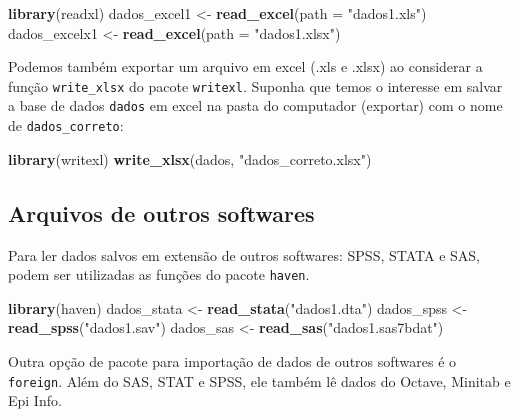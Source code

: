 \documentclass[
]{book}
\newenvironment{Shaded}{\begin{snugshade}}{\end{snugshade}}
\newcommand{\DataTypeTok}[1]{\textcolor[rgb]{0.13,0.29,0.53}{#1}}
\newcommand{\KeywordTok}[1]{\textcolor[rgb]{0.13,0.29,0.53}{\textbf{#1}}}
\newcommand{\NormalTok}[1]{#1}
\newcommand{\StringTok}[1]{\textcolor[rgb]{0.31,0.60,0.02}{#1}}
\begin{document}
\begin{Shaded}
\begin{Highlighting}[]
\KeywordTok{library}\NormalTok{(readxl)}
\NormalTok{dados_excel1 <-}\StringTok{ }\KeywordTok{read_excel}\NormalTok{(}\DataTypeTok{path =} \StringTok{"dados1.xls"}\NormalTok{)}
\NormalTok{dados_excelx1 <-}\StringTok{ }\KeywordTok{read_excel}\NormalTok{(}\DataTypeTok{path =} \StringTok{"dados1.xlsx"}\NormalTok{)}
\end{Highlighting}
\end{Shaded}

Podemos também exportar um arquivo em excel (.xls e .xlsx) ao considerar a função \texttt{write\_xlsx} do pacote \texttt{writexl}. Suponha que temos o interesse em salvar a base de dados \texttt{dados} em excel na pasta do computador (exportar) com o nome de \texttt{dados\_correto}:

\begin{Shaded}
\begin{Highlighting}[]
\KeywordTok{library}\NormalTok{(writexl)}
\KeywordTok{write_xlsx}\NormalTok{(dados, }\StringTok{"dados_correto.xlsx"}\NormalTok{)}
\end{Highlighting}
\end{Shaded}

\hypertarget{arquivos-de-outros-softwares}{%
\subsection{Arquivos de outros softwares}\label{arquivos-de-outros-softwares}}

Para ler dados salvos em extensão de outros softwares: SPSS, STATA e SAS, podem ser utilizadas as funções do pacote \texttt{haven}.

\begin{Shaded}
\begin{Highlighting}[]
\KeywordTok{library}\NormalTok{(haven)}
\NormalTok{dados_stata <-}\StringTok{ }\KeywordTok{read_stata}\NormalTok{(}\StringTok{"dados1.dta"}\NormalTok{)}
\NormalTok{dados_spss <-}\StringTok{ }\KeywordTok{read_spss}\NormalTok{(}\StringTok{"dados1.sav"}\NormalTok{)}
\NormalTok{dados_sas <-}\StringTok{ }\KeywordTok{read_sas}\NormalTok{(}\StringTok{"dados1.sas7bdat"}\NormalTok{)  }
\end{Highlighting}
\end{Shaded}

Outra opção de pacote para importação de dados de outros softwares é o \texttt{foreign}. Além do SAS, STAT e SPSS, ele também lê dados do Octave, Minitab e Epi Info.
\end{document}
